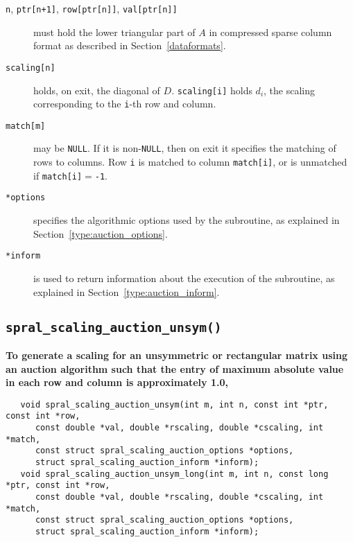 \begin{description}

\item[\texttt{n}, \texttt{ptr[n+1]}, \texttt{row[ptr[n]]}, \texttt{val[ptr[n]]}] must hold the lower triangular part of $A$ in compressed sparse column format as described in Section~\ref{dataformats}.

\item[\texttt{scaling[n]}] holds, on exit, the diagonal of $D$.
\texttt{scaling[i]} holds $d_i$, the scaling corresponding to the
\texttt{i}-th row and column.

\item[\texttt{match[m]}] may be \texttt{NULL}. If it is non-\texttt{NULL},
then on exit it specifies the matching of rows to columns.
Row \texttt{i} is matched to column \texttt{match[i]}, or is unmatched
if \texttt{match[i]}$=$\texttt{-1}.

\item[\texttt{*options}] specifies the algorithmic options used by the subroutine, as explained in Section~\ref{type:auction_options}.

\item[\texttt{*inform}] is used to return information about the execution of the subroutine, as explained in Section~\ref{type:auction_inform}.


\end{description}

\subsection{\texttt{spral\_scaling\_auction\_unsym()}}

\textbf{\noindent
   To generate a scaling for an unsymmetric or rectangular matrix using an auction algorithm such that the entry of maximum absolute value in each row and column is approximately 1.0,
}
\vspace*{-0.1cm}
\begin{verbatim}
   void spral_scaling_auction_unsym(int m, int n, const int *ptr, const int *row,
      const double *val, double *rscaling, double *cscaling, int *match,
      const struct spral_scaling_auction_options *options,
      struct spral_scaling_auction_inform *inform);
   void spral_scaling_auction_unsym_long(int m, int n, const long *ptr, const int *row,
      const double *val, double *rscaling, double *cscaling, int *match,
      const struct spral_scaling_auction_options *options,
      struct spral_scaling_auction_inform *inform);
\end{verbatim}

